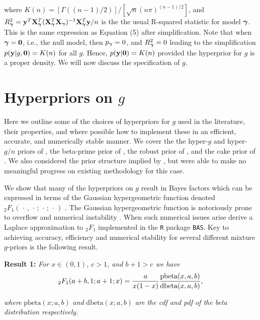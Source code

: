 \noindent where $K(n) = [\Gamma( (n-1)/2 )]/[\sqrt{n}(n\pi)^{(n-1)/2}]$, and
$R_{\boldsymbol \gamma}^2 = {\bf y}^T{\bf X}_{\boldsymbol \gamma}^T({\bf X}_{\boldsymbol \gamma}^T{\bf X}_{\boldsymbol \gamma})^{-1}{\bf X}_{\boldsymbol \gamma}^T{\bf y}/n$ is 
the the usual R-squared statistic for model ${\boldsymbol \gamma}$.
This is the same expression as \cite{Liang2008} Equation (5) 
after simplification. Note that
when ${\boldsymbol \gamma} = {\bf 0}$, i.e., the null model, then $p_{\boldsymbol \gamma} = 0$, and
$R_{\boldsymbol \gamma}^2 = 0$ leading to the simplification $p({\bf y}|g,{\bf 0}) = K(n)$
for all $g$. Hence, $p({\bf y}|{\bf 0}) = K(n)$ provided the hyperprior for $g$ is a proper density. We will now discuss the specification of $g$.


\section{Hyperpriors on $g$}
\label{sec:hyperpriors}

Here we outline some of the choices of hyperpriors for $g$ used in the literature, their
properties, and where possible how to implement these in an efficient, 
accurate, and
numerically stable manner. We cover the 
the hyper-$g$ and hyper-$g/n$ priors of \cite{Liang2008}, the beta-prime prior
of \cite{Maruyama2011}, the robust prior of \cite{Bayarri2012}, and the cake
prior of \cite{OrmerodEtal2017}.
We also considered the prior structure implied by \cite{Zellner1980}, but were able to make no
meaningful progress on existing methodology for this case.

We show that many of the hyperpriors on $g$ result in Bayes factors which can be expressed
in terms of the Gaussian hypergeometric function denoted 
${}_2F_1(\,\cdot\,,\,\cdot\,;\,\cdot\,;\,\cdot\,)$ \citep[see for example Chapter 15 of ][]{Abramowitz1972}.
The Gaussian hypergeometric function is notoriously prone 
to overflow and numerical instability \citep{Pearson2017}. 
When such numerical issues arise 
\cite{Liang2008} derive a Laplace approximation to ${}_2F_1$ implemented in the {\tt R} package {\tt BAS}.
Key to achieving accuracy, efficiency and numerical stability for several different mixture $g$-priors is the following result.

 
\noindent 
{\bf Result 1:} {\it For $x\in(0,1)$, $c>1$, and $b +1 > c$ we have}
\begin{equation}\label{eq:logGuassHypergeometric2}
	\displaystyle {}_2F_1(a+b,1;a+1;x) = \frac{a}{x(1 - x)}   \frac{\mbox{pbeta}(x,a,b)}{\mbox{dbeta}(x,a,b)},
\end{equation}

\noindent 
{\it where} $\mbox{pbeta}(x;a,b)$ {\it and} $\mbox{dbeta}(x;a,b)$ {\it are the cdf and pdf of the beta 
	distribution respectively.}

